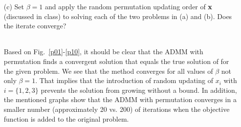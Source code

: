 \documentclass[answers]{exam}
\newcommand\x{{\bf x}}
\begin{document}
\begin{itemize}
\begin{framed}
~\\
\end{framed}
\newpage
\item[(c)] Set $\beta=1$ and apply the random permutation updating order of $\x$ (discussed in class) to solving each of the two problems in (a) and (b). Does the iterate converge? 
~\\
~\\

\begin{framed}
Based on Fig.~\ref{p01}-\ref{p10}, it should be clear that the ADMM with permutation finds a convergent solution that equals the true solution of for the given problem. We see that the method converges for all values of $\beta$ not only $\beta=1$. That implies that the introduction of random updating of $x_i$ with $i=\{1,2,3\}$ prevents the solution from growing without a bound. In addition, the mentioned graphs show that the ADMM with permutation converges in a smaller number (approximately 20 vs. 200) of iterations when the objective function is added to the original problem. 




\end{framed}
\end{itemize}
\end{document}
